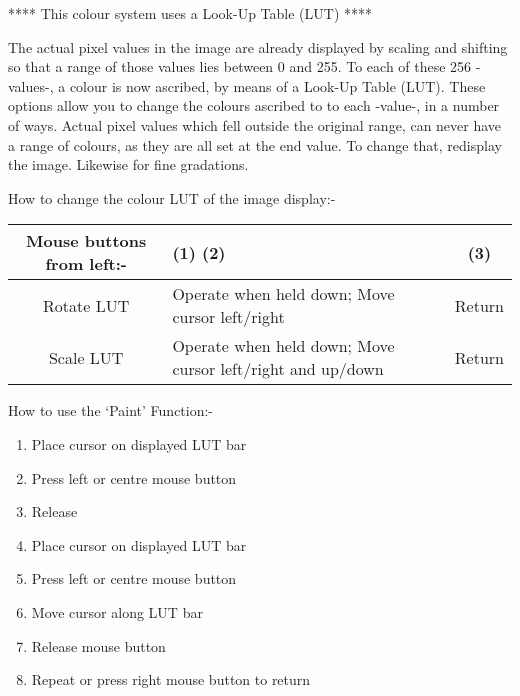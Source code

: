 \begin{small}
{{ ****  This colour system uses a Look-Up Table (LUT)  ****

 The actual pixel values in the image are already displayed
 by scaling and shifting so that a range of those values lies
 between 0 and 255. To each of these 256 -values-, a colour
 is now ascribed, by means of a Look-Up Table (LUT).
 These options allow you to change the colours ascribed to
 to each -value-, in a number of ways. Actual pixel values
 which fell outside the original range, can never have a range
 of colours, as they are all set at the end value. To change
 that, redisplay the image. Likewise for fine gradations.
     
 How to change the colour LUT of the image display:-
  
\hspace*{4ex}\begin{tabular}{|c|p{3.5in}|c|} \hline
      Mouse buttons from left:- &   (1)   \hspace*{4ex} (2)   & (3) \\ \hline
       Rotate LUT    & Operate when held down; Move cursor left/right &
                        Return \\ \hline
       Scale  LUT    & Operate when held down;  Move cursor left/right 
                        and up/down & Return \\ 
 \hline\end{tabular}

How to use the `Paint' Function:-

\begin{enumerate}
  \item              Place cursor on displayed LUT bar
  \item                Press left or centre mouse button
  \item                Release
  \item                Place cursor on displayed LUT bar
  \item                Press left or centre mouse button
  \item                Move cursor along LUT bar
  \item                Release mouse button
  \item                Repeat or press right mouse button to return
\end{enumerate}



}}
\end{small}
